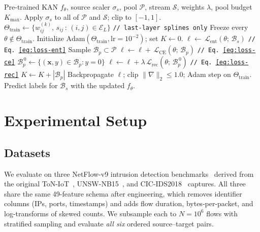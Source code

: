 \documentclass[10pt, conference, letterpaper]{IEEEtran}
\begin{document}
\begin{algorithm}[h]
\caption{Spline-Only CTTA for Cross-Network NIDS}
\label{alg:tta}
\begin{algorithmic}[1]
\REQUIRE Pre-trained KAN $f_\theta$, source scaler $\sigma_s$, pool $\mathcal{P}$, stream $\mathcal{S}$, weights $\lambda$, pool budget $K_{\max}$.
\STATE Apply $\sigma_s$ to all of $\mathcal{P}$ and $\mathcal{S}$; clip to $[-1, 1]$.
\STATE $\Theta_{\text{train}} \leftarrow \big\{w_{ij}^{(k)},\, s_{ij} \,:\, (i,j) \in \mathcal{E}_L\big\}$ \hfill\texttt{// last-layer splines only}
\STATE Freeze every $\theta \notin \Theta_{\text{train}}$.
\STATE Initialize $\mathrm{Adam}(\Theta_{\text{train}}, \mathrm{lr} = 10^{-2})$; set $K \leftarrow 0$.
    \STATE $\ell \leftarrow \, \mathcal{L}_{\text{ent}}\!\left(\theta;\, \mathcal{B}_s\right)$ \hfill\texttt{// Eq.~\eqref{eq:loss-ent}}
        \STATE Sample $\mathcal{B}_p \subset \mathcal{P}$
        \STATE $\ell \leftarrow \ell + \, \mathcal{L}_{\text{CE}}\!\left(\theta;\, \mathcal{B}_p\right)$ \hfill\texttt{// Eq.~\eqref{eq:loss-ce}}
        \STATE $\mathcal{B}_p^{\,0} \leftarrow \{(\mathbf{x}, y) \in \mathcal{B}_p : y = 0\}$
            \STATE $\ell \leftarrow \ell + \lambda\, \mathcal{L}_{\text{rec}}\!\left(\theta;\, \mathcal{B}_p^{\,0}\right)$ \hfill\texttt{// Eq.~\eqref{eq:loss-rec}}
        \ENDIF
        \STATE $K \leftarrow K + |\mathcal{B}_p|$
    \ENDIF
    \STATE Backpropagate $\ell$; clip $\|\nabla\|_2 \leq 1.0$; Adam step on $\Theta_{\text{train}}$.
    \STATE Predict labels for $\mathcal{B}_s$ with the updated $f_\theta$.
\ENDFOR
\end{algorithmic}
\end{algorithm}


\section{Experimental Setup}
\label{sec:setup}

\subsection{Datasets}

We evaluate on three NetFlow-v9 intrusion detection benchmarks~\cite{sarhan2021netflow, sarhan2022towards, luay2025temporal} derived from the original ToN-IoT~\cite{moustafa2019toniot}, UNSW-NB15~\cite{moustafa2015unsw}, and CIC-IDS2018~\cite{sharafaldin2018cicids} captures. All three share the same 49-feature schema after engineering, which removes identifier columns (IPs, ports, timestamps) and adds flow duration, bytes-per-packet, and log-transforms of skewed counts. We subsample each to $N = 10^6$ flows with stratified sampling and evaluate \emph{all six} ordered source--target pairs.
\end{document}
